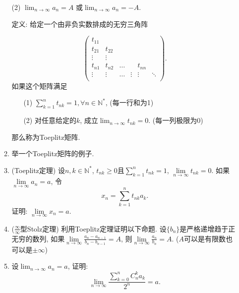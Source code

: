 \documentclass[UTF8,11pt, a4paper, oneside, fontset=none]{ctexbook}
\begin{document}
\begin{enumerate}
\begin{enumerate}
(2) $\lim_{n \to \infty} a_n = A$ 或$\lim_{n \to \infty} a_n = -A$.

\noindent
{\color{purple} 定义}: 给定一个由非负实数排成的无穷三角阵

\[
\left( \begin{array}{ccccccc}
t_{11}      &  & & & &    \\
t_{21}      &t_{22} &  &  &   \\
\vdots      & \vdots     & &  &  &   \\
t_{n1}     & t_{n2}      & \hdots        &    & t_{nn} &    \\
\vdots & \vdots & \hdots       & \vdots       & \vdots   & \ddots  \\
\end{array} \right). 
\]
如果这个矩阵满足
\begin{itemize}
\item[(1)] $\sum_{k=1}^n t_{nk} =1, \forall n \in \mathbb N^*$, (每一行和为1)
\item[(2)] 对任意给定的$k$, 成立$\lim_{n \to \infty} t_{nk} =0$. (每一列极限为0)
\end{itemize}
那么称为Toeplitz矩阵. 

\item 举一个Toeplitz矩阵的例子.

\item (Toeplitz定理) 设$n, k \in \mathbb N^*$, $t_{nk} \geq 0$且$\sum_{k=1}^n t_{nk} =1$, $\lim\limits_{n \to \infty} t_{nk} =0$. 如果$\lim\limits_{n \to \infty} a_n =a$, 令
\[
x_n = \sum_{k=1}^n t_{nk} a_k.
\]
证明: $\lim\limits_{n \to \infty} x_n =a$.

\item ($\frac{\infty}{\infty}$型Stolz定理) 
利用Toeplitz定理证明以下命题. 设$\{b_n\}$是严格递增趋于正无穷的数列, 如果$\lim\limits_{n \to \infty} \frac{a_n - a_{n-1}}{b_n - b_{n-1}} =A$,
则$\lim\limits_{n \to \infty}\frac{a_n}{b_n} = A$. ($A$可以是有限数也可以是$\pm\infty$)

\item 设$\lim_{n \to \infty} a_n =a$, 证明:
\[
\lim_{n \to \infty} \frac{\sum_{k=0}^n C_n^k a_k}{2^n} =a.
\]

\end{enumerate}

\end{enumerate}
\end{document}
